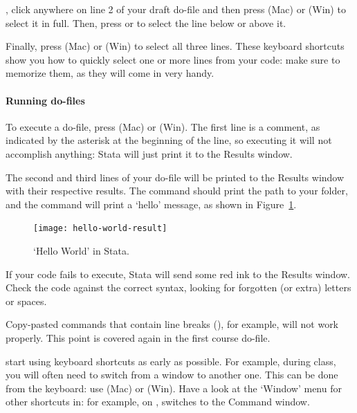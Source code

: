 , click anywhere on line 2 of your draft do-file and then press  (Mac) or  (Win) to select it in full. Then, press  or  to select the line below or above it.%

Finally, press  (Mac) or  (Win) to select all three lines. These keyboard shortcuts show you how to quickly select one or more lines from your code: make sure to memorize them, as they will come in very handy.%

\paragraph{Running do-files}

To execute a do-file, press  (Mac) or  (Win). The first line is a comment, as indicated by the asterisk at the beginning of the line, so executing it will not accomplish anything: Stata will just print it to the Results window.%

The second and third lines of your do-file will be printed to the Results window with their respective results. The  command should print the path to your \SRQM folder, and the  command will print a `hello' message, as shown in Figure~\ref{fig:hello-world-result}.%

\begin{figure}%
  \texttt{[image: hello-world-result]}

  \caption{`Hello World' in Stata.}
  \label{fig:hello-world-result}
\end{figure}

 If your code fails to execute, Stata will send some red ink to the Results window. Check the code against the correct syntax, looking for forgotten (or extra) letters or spaces.%

 Copy-pasted commands that contain line breaks (\cmd{///}), for example, will not work properly. This point is covered again in the first course do-file.%

 start using keyboard shortcuts as early as possible. For example, during class, you will often need to switch from a window to another one. This can be done from the keyboard: use  (Mac) or  (Win). Have a look at the `Window' menu for other shortcuts in: for example, on \OSX,  switches to the Command window.%

